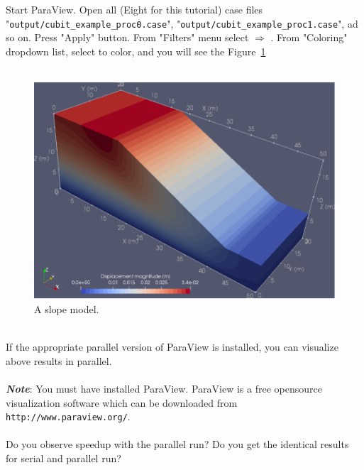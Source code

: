 Start ParaView. Open all (Eight for this tutorial) case files "\texttt{output/cubit\_example\_proc0.case}", "\texttt{output/cubit\_example\_proc1.case}", ad so on. Press "Apply" button. From "Filters" menu select  $\Rightarrow$ . From "Coloring" dropdown list, select  to color, and you will see the Figure~\ref{fig:pardisp}\\
\\
\begin{figure}[ht]
\centering
\includegraphics[scale=0.7]{cubit_example_disp}
\caption{A slope model.}
\label{fig:pardisp}
\end{figure}
\\
If the appropriate parallel version of ParaView is installed, you can visualize above results in parallel.\\
\\
\textbf{\emph{Note}}: You must have installed ParaView. ParaView is a free opensource visualization software which
can be downloaded from \texttt{http://www.paraview.org/}.\\
\\
Do you observe speedup with the parallel run? Do you get the identical results for serial and parallel run?
